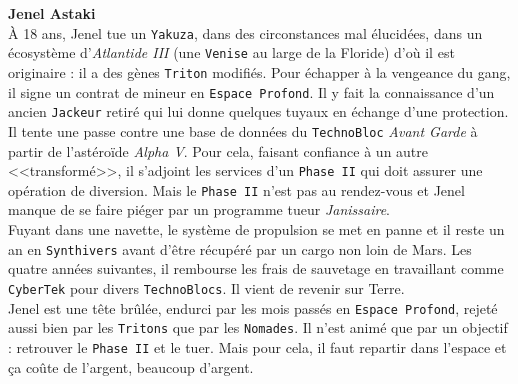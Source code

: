 \documentclass[11pt,twoside,a4paper]{article}
\begin{document}
\begin{multicols}{2}
	\textbf{Jenel Astaki}~\\
	{\`A} 18 ans, Jenel tue un \texttt{Yakuza}, dans des circonstances mal {\'e}lucid{\'e}es, dans un {\'e}cosyst{\`e}me d'\emph{Atlantide III} (une \texttt{Venise} au large de la Floride) d'o{\`u} il est originaire : il a des g{\`e}nes \texttt{Triton} modifi{\'e}s. Pour {\'e}chapper {\`a} la vengeance du gang, il signe un contrat de mineur en \texttt{Espace Profond}. Il y fait la connaissance d'un ancien \texttt{Jackeur} retir{\'e} qui lui donne quelques tuyaux en {\'e}change d'une protection. Il tente une passe contre une base de donn{\'e}es du \texttt{TechnoBloc} \emph{Avant Garde} {\`a} partir de l'ast{\'e}ro{\"i}de \emph{Alpha V}. Pour cela, faisant confiance {\`a} un autre <<transform{\'e}>>, il s'adjoint les services d'un \texttt{Phase II} qui doit assurer une op{\'e}ration de diversion. Mais le \texttt{Phase II} n'est pas au rendez-vous et Jenel manque de se faire pi{\'e}ger par un programme tueur \emph{Janissaire}. ~\\
	Fuyant dans une navette, le syst{\`e}me de propulsion se met en panne et il reste un an en \texttt{Synthivers} avant d'{\^e}tre r{\'e}cup{\'e}r{\'e} par un cargo non loin de Mars. Les quatre ann{\'e}es suivantes, il rembourse les frais de sauvetage en travaillant comme \texttt{CyberTek} pour divers \texttt{TechnoBlocs}. Il vient de revenir sur Terre. ~\\
	Jenel est une t{\^e}te br{\^u}l{\'e}e, endurci par les mois pass{\'e}s en \texttt{Espace Profond}, rejet{\'e} aussi bien par les \texttt{Tritons} que par les \texttt{Nomades}. Il n'est anim{\'e} que par un objectif : retrouver le \texttt{Phase II} et le tuer. Mais pour cela, il faut repartir dans l'espace et \c{c}a co{\^u}te de l'argent, beaucoup d'argent. ~\\
	
	\vfill
	\columnbreak
	

\end{multicols}
\end{document}
